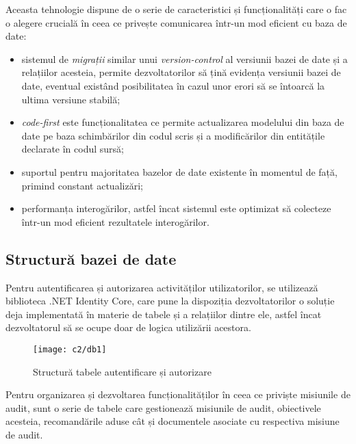 Aceasta tehnologie dispune de o serie de caracteristici și funcționalități care o fac o alegere crucială în ceea ce privește comunicarea într-un mod eficient cu baza de date:
\begin{itemize}
	
	\item sistemul de \textit{migrații} similar unui \textit{version-control} al versiunii bazei de date și a relațiilor acesteia, permite dezvoltatorilor să țină evidența versiunii bazei de date, eventual existând posibilitatea în cazul unor erori să se întoarcă la ultima versiune stabilă;
	
	\item \textit{code-first} este funcționalitatea ce permite actualizarea modelului din baza de date pe baza schimbărilor din codul scris și a modificărilor din entitățile declarate în codul sursă;
	
	\item suportul pentru majoritatea bazelor de date existente în momentul de față, primind constant actualizări;
	
	\item performanța interogărilor, astfel încat sistemul este optimizat să colecteze într-un mod eficient rezultatele interogărilor.
	 
\end{itemize}

\subsection*{Structură bazei de date}

Pentru autentificarea și autorizarea activităților utilizatorilor, se utilizează biblioteca .NET Identity Core, care pune la dispoziția dezvoltatorilor o soluție deja implementată în materie de tabele și a relațiilor dintre ele, astfel încat dezvoltatorul să se ocupe doar de logica utilizării acestora.
 
\vspace{1cm}
\begin{figure}[h]
	\centering
	
	\texttt{[image: c2/db1]}
	\caption{Structură tabele autentificare și autorizare}
\end{figure}

Pentru organizarea și dezvoltarea funcționalităților în ceea ce priviște misiunile de audit, sunt o serie de tabele care gestionează misiunile de audit, obiectivele acesteia, recomandările aduse cât și documentele asociate cu respectiva misiune de audit.

